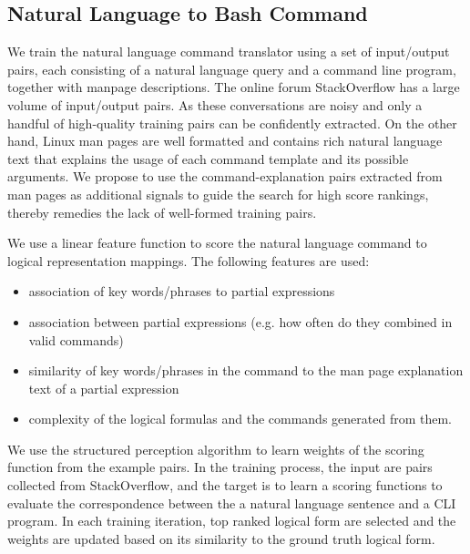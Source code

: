 \subsection{Natural Language to Bash Command}
\label{subsec:parser}
We train the natural language command translator using a set of input/output pairs, each consisting of a natural language query and a command line program, together with manpage descriptions. The online forum StackOverflow has a large volume of input/output pairs. As these conversations are noisy and only a handful of high-quality training pairs can be confidently extracted. On the other hand, Linux man pages are well formatted and contains rich natural language text that explains the usage of each command template and its possible arguments. We propose to use the command-explanation pairs extracted from man pages as additional signals to guide the search for high score rankings, thereby remedies the lack of well-formed training pairs.

We use a linear feature function to score the natural language command to logical representation mappings. The following features are used:
\begin{itemize}\itemsep-1pt
	\item association of key words/phrases to partial expressions
	\item association between partial expressions (e.g. how often do they combined in valid commands)
	\item similarity of key words/phrases in the command to the man page explanation text of a partial expression
	\item complexity of the logical formulas and the commands generated from them.
\end{itemize}
We use the structured perception algorithm to learn weights of the scoring function from the example pairs. In the training process, the input are pairs collected from StackOverflow, and the target is to learn a scoring functions to evaluate the correspondence between the a natural language sentence and a CLI program. In each training iteration, top ranked logical form are selected and the weights are updated based on its similarity to the ground truth logical form. 
